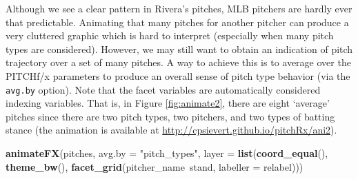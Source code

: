 \documentclass[12pt,]{isuthesis}
\newenvironment{Shaded}{\begin{snugshade}}{\end{snugshade}}
\newcommand{\KeywordTok}[1]{\textcolor[rgb]{0.13,0.29,0.53}{\textbf{{#1}}}}
\newcommand{\DataTypeTok}[1]{\textcolor[rgb]{0.13,0.29,0.53}{{#1}}}
\newcommand{\StringTok}[1]{\textcolor[rgb]{0.31,0.60,0.02}{{#1}}}
\newcommand{\NormalTok}[1]{{#1}}
\begin{document}
Although we see a clear pattern in Rivera's pitches, MLB pitchers are
hardly ever that predictable. Animating that many pitches for another
pitcher can produce a very cluttered graphic which is hard to interpret
(especially when many pitch types are considered). However, we may still
want to obtain an indication of pitch trajectory over a set of many
pitches. A way to achieve this is to average over the PITCHf/x
parameters to produce an overall sense of pitch type behavior (via the
\texttt{avg.by} option). Note that the facet variables are automatically
considered indexing variables. That is, in Figure \ref{fig:animate2},
there are eight `average' pitches since there are two pitch types, two
pitchers, and two types of batting stance (the animation is available at
\url{http://cpsievert.github.io/pitchRx/ani2}).

\begin{Shaded}
\begin{Highlighting}[]
\KeywordTok{animateFX}\NormalTok{(pitches, }\DataTypeTok{avg.by =} \StringTok{"pitch_types"}\NormalTok{, }\DataTypeTok{layer =} \KeywordTok{list}\NormalTok{(}\KeywordTok{coord_equal}\NormalTok{(), }\KeywordTok{theme_bw}\NormalTok{(),}
  \KeywordTok{facet_grid}\NormalTok{(pitcher_name~stand, }\DataTypeTok{labeller =} \NormalTok{relabel)))}
\end{Highlighting}
\end{Shaded}
\end{document}
